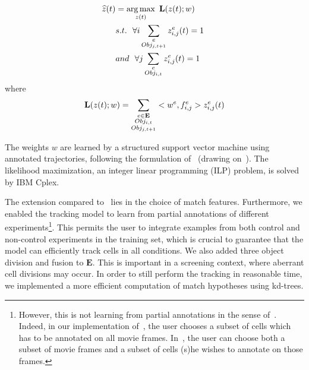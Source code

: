 \begin{align}
\widehat{z}(t) & = \operatorname*{arg\,max}_{\substack{z(t)}}~ \mathbf{L}(z(t) ; w) \\
 & s.t.\ \ \forall i \sum_{\substack{e\\Obj_{j, t+1}}} z^{e}_{i, j}(t) = 1\ \\ 
 & and\ \ \forall j \sum_{\substack{e\\Obj_{i, t}}} z^{e}_{i, j}(t) = 1
\label{formulation}
\end{align}
where 
\begin{equation*}
\mathbf{L}(z(t) ; w) = \sum_{\substack{e\in \mathbf{E}\\Obj_{i, t}\\Obj_{j, t+1}}} <w^e, f^e_{i, j}> z^{e}_{i, j}(t)\\
\end{equation*}

The weights $w$ are learned by a structured support vector machine using annotated trajectories, following the formulation of~\cite{lou} (drawing on~\cite{Tsochantaridis}). The likelihood maximization, an integer linear programming (ILP) problem, is solved by IBM Cplex.

The extension compared to~\cite{lou} lies in the choice of match
features. Furthermore, we enabled the tracking model to learn from
partial annotations of different experiments\footnote{However, this is
  not learning from partial annotations in the sense
  of~\cite{loupartial}. Indeed, in our implementation of~\cite{lou},
  the user chooses a subset of cells which has to be annotated on all
  movie frames. In~\cite{loupartial}, the user can choose both a
  subset of movie frames and a subset of cells (s)he wishes to
  annotate on those frames.}. This permits the user to integrate
examples from both control and non-control experiments in the training
set, which is crucial to guarantee that the model can efficiently
track cells in all conditions. We also added three object division and
fusion to $\mathbf{E}$. This is important in a screening context,
where aberrant cell divisions may occur. In order to still perform the
tracking in reasonable time, we  implemented a more efficient computation of match hypotheses
using kd-trees.

